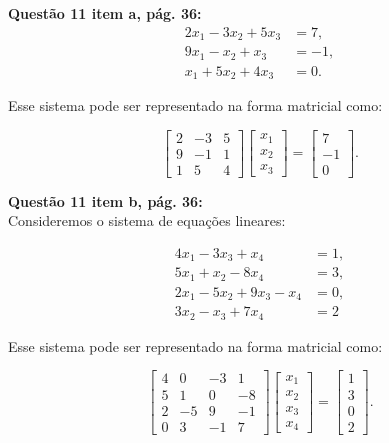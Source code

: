 \documentclass[a4paper,12pt]{article}
\begin{document}

\textbf{Questão 11 item a, pág. 36:}\\

\[
\begin{aligned}
2x_1 - 3x_2 + 5x_3 &= 7, \\
9x_1 - x_2 + x_3 &= -1, \\
x_1 + 5x_2 + 4x_3 &= 0.
\end{aligned}
\]

Esse sistema pode ser representado na forma matricial como:

\[
\begin{bmatrix} 
2 & -3 & 5 \\ 
9 & -1 & 1 \\ 
1 & 5 & 4 
\end{bmatrix} 
\begin{bmatrix} 
x_1 \\ 
x_2 \\ 
x_3 
\end{bmatrix} =
\begin{bmatrix} 
7 \\ 
-1 \\ 
0 
\end{bmatrix}.
\]


\textbf{Questão 11 item b, pág. 36:}\\

Consideremos o sistema de equações lineares:

\[
\begin{aligned}
4x_1 - 3x_3 + x_4 &= 1, \\
5x_1 + x_2 - 8x_4 &= 3, \\
2x_1 - 5x_2 + 9x_3 - x_4 &= 0, \\
3x_2 - x_3 + 7x_4 &= 2
\end{aligned}
\]

Esse sistema pode ser representado na forma matricial como:

\[
\begin{bmatrix} 
4 & 0 & -3 & 1 \\ 
5 & 1 & 0 & -8 \\ 
2 & -5 & 9 & -1 \\ 
0 & 3 & -1 & 7 
\end{bmatrix} 
\begin{bmatrix} 
x_1 \\ 
x_2 \\ 
x_3 \\ 
x_4
\end{bmatrix} =
\begin{bmatrix} 
1 \\ 
3 \\ 
0 \\ 
2
\end{bmatrix}.
\]
\end{document}
